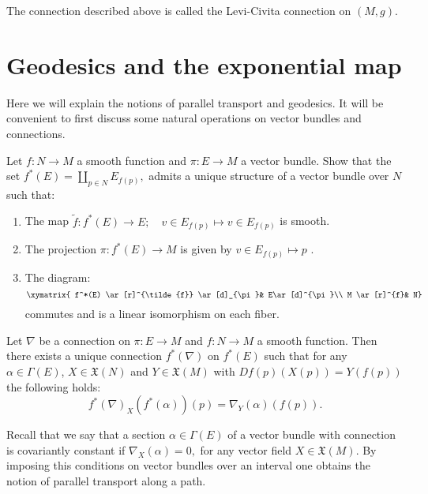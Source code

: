 The connection described above is called the Levi-Civita
connection  on $(M,g)$.



\section{Geodesics and the exponential map}

Here we will explain the notions of parallel transport and geodesics. It will be convenient to
first discuss some natural operations on vector bundles and connections.

\begin{exercise}
	Let $f:N\rightarrow M$ a smooth function and $\pi:E\rightarrow M$ a vector
	bundle. Show that the set $f^{\ast}(E)=\coprod_{p\in N}E_{f(p)},$ admits a
	unique structure of a vector bundle over $N$ such that:
	
	\begin{enumerate}
		\item The map $\tilde{f}:f^{\ast}(E)\rightarrow E;\quad v\in E_{f(p)}\mapsto
		v\in E_{f(p)}$ is smooth.
		
		\item The projection $\pi:f^{\ast}(E)\rightarrow M$ is given by $v\in
		E_{f(p)}\mapsto p$ .
		
		\item The diagram:
		\[
		\xymatrix{
			f^*(E) \ar[r]^{\tilde{f}} \ar[d]_{\pi}& E\ar[d]^{\pi}\\
			M \ar[r]^{f}& N}
		\]
		commutes and is a linear isomorphism on each fiber.
		
	\end{enumerate}
\end{exercise}

\begin{exercise}
	Let $\nabla$ be a connection on $\pi:E\rightarrow M$ and $f:N\rightarrow M$ a
	smooth function. Then there exists a unique connection $f^{\ast}(\nabla)$ on
	$f^{\ast}(E)$ such that for any $\alpha\in\Gamma(E)$, $X\in\mathfrak{X}(N)$
	and $Y\in\mathfrak{X}(M)$ with $Df(p)(X(p))=Y(f(p))$ the following holds:
	\begin{equation}
	f^{\ast}(\nabla)_{X}(f^{\ast}(\alpha))(p)=\nabla_{Y}(\alpha)(f(p)).
	\label{pull0}%
	\end{equation}
	
\end{exercise}



Recall that we say that a section $\alpha\in\Gamma(E)$ of a vector bundle with
connection is covariantly constant if $\nabla_{X}(\alpha)=0,$ for any vector
field $X\in\mathfrak{X}(M)$. By imposing this conditions on vector bundles
over an interval one obtains the notion of parallel transport along a path.

